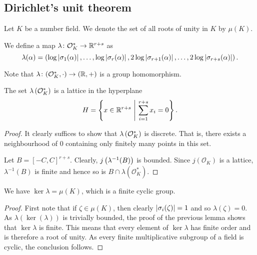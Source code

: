 \newpage

\subsection{Dirichlet's unit theorem}

\begin{definicija}
Let $K$ be a number field. We denote the set of all roots of unity
in $K$ by $\mu(K)$.
\end{definicija}

\begin{definicija}
We define a map $\lambda \colon \mathcal{O}_K^* \to \mathbb{R}^{r+s}$ as
\[
\lambda(\alpha) =
\left(\log \left\lvert \sigma_1(\alpha)\right\rvert, \dots,
\log \left\lvert \sigma_r(\alpha)\right\rvert,
2 \log \left\lvert \sigma_{r+1}(\alpha)\right\rvert, \dots,
2 \log \left\lvert \sigma_{r+s}(\alpha)\right\rvert\right).
\]
\end{definicija}

\begin{opomba}
Note that $\lambda \colon (\mathcal{O}_K^*, \cdot) \to (\mathbb{R}, +)$ is
a group homomorphism.
\end{opomba}

\begin{lema}
The set $\lambda \left(\mathcal{O}_K^*\right)$ is a lattice in the
hyperplane
\[
H = \left\{x \in \mathbb{R}^{r+s}~\middle\vert~\sum_{i=1}^{r+s} x_i = 0\right\}.
\]
\end{lema}

\begin{proof}
It clearly suffices to show that $\lambda \left(\mathcal{O}_K^*\right)$ is
discrete. That is, there exists a neighbourhood of $0$ containing
only finitely many points in this set.

Let $B = [-C, C]^{r+s}$. Clearly, $j \left(\lambda^{-1}(B)\right)$ is
bounded. Since $j(\mathcal{O}_K)$ is a lattice, $\lambda^{-1}(B)$
is finite and hence so is $B \cap \lambda(\mathcal{O}_K^*)$.
\end{proof}

\begin{lema}
We have $\ker \lambda = \mu(K)$, which is a finite cyclic group.
\end{lema}

\begin{proof}
First note that if $\zeta \in \mu(K)$, then clearly
$\left\lvert \sigma_i(\zeta)\right\rvert = 1$ and so $\lambda(\zeta) = 0$. As
$\lambda(\ker(\lambda))$ is trivially bounded, the proof of the
previous lemma shows that $\ker \lambda$ is finite. This means
that every element of $\ker \lambda$ has finite order and is
therefore a root of unity. As every finite multiplicative subgroup
of a field is cyclic, the conclusion follows.
\end{proof}

